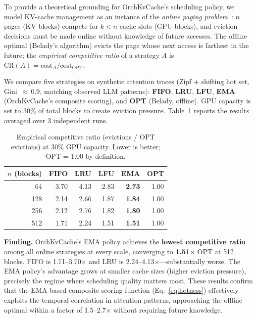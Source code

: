 \documentclass[conference]{IEEEtran}
\begin{document}
To provide a theoretical grounding for OrchKvCache's scheduling policy, we model KV-cache management as an instance of the \emph{online paging problem}~\cite{sleator-tarjan}: $n$ pages (KV blocks) compete for $k < n$ cache slots (GPU blocks), and eviction decisions must be made online without knowledge of future accesses. The offline optimal (Belady's algorithm) evicts the page whose next access is farthest in the future; the \emph{empirical competitive ratio} of a strategy $A$ is $\text{CR}(A) = \text{cost}_A / \text{cost}_{\text{OPT}}$.

We compare five strategies on synthetic attention traces (Zipf + shifting hot set, Gini~$\approx$\,0.9, matching observed LLM patterns): \textbf{FIFO}, \textbf{LRU}, \textbf{LFU}, \textbf{EMA} (OrchKvCache's composite scoring), and \textbf{OPT} (Belady, offline). GPU capacity is set to 30\% of total blocks to create eviction pressure. Table~\ref{tab:cr} reports the results averaged over 3 independent runs.

\begin{table}[t]
\centering
\caption{Empirical competitive ratio (evictions / OPT evictions) at 30\% GPU capacity. Lower is better; OPT = 1.00 by definition.}
\label{tab:cr}
\small
\begin{tabular}{@{}rrrrrr@{}}
\toprule
$n$ (blocks) & FIFO & LRU & LFU & \textbf{EMA} & OPT \\
\midrule
64  & 3.70 & 4.13 & 2.83 & \textbf{2.73} & 1.00 \\
128 & 2.14 & 2.66 & 1.87 & \textbf{1.84} & 1.00 \\
256 & 2.12 & 2.76 & 1.82 & \textbf{1.80} & 1.00 \\
512 & 1.71 & 2.24 & 1.51 & \textbf{1.51} & 1.00 \\
\bottomrule
\end{tabular}
\end{table}

\textbf{Finding.} OrchKvCache's EMA policy achieves the \textbf{lowest competitive ratio} among all online strategies at every scale, converging to \textbf{1.51$\times$} OPT at 512 blocks. FIFO is 1.71--3.70$\times$ and LRU is 2.24--4.13$\times$---substantially worse. The EMA policy's advantage grows at smaller cache sizes (higher eviction pressure), precisely the regime where scheduling quality matters most. These results confirm that the EMA-based composite scoring function (Eq.~\ref{eq:hotness}) effectively exploits the temporal correlation in attention patterns, approaching the offline optimal within a factor of 1.5--2.7$\times$ without requiring future knowledge.
\end{document}
